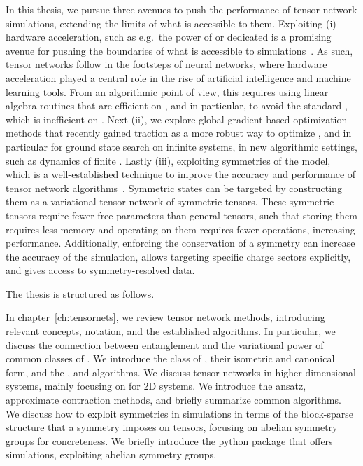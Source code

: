 In this thesis, we pursue three avenues to push the performance of tensor network simulations, extending the limits of what is accessible to them.
%
%
Exploiting (i) hardware acceleration, such as e.g.~the power of  or dedicated  is a promising avenue for pushing the boundaries of what is accessible to  simulations~\cite{ganahl2023, menczer2023a, menczer2024}.
%
As such, tensor networks follow in the footsteps of neural networks, where hardware acceleration played a central role in the rise of artificial intelligence and machine learning tools.
%
From an algorithmic point of view, this requires using linear algebra routines that are efficient on , and in particular, to avoid the standard , which is inefficient on .
%
%
Next (ii), we explore global gradient-based optimization methods that recently gained traction as a more robust way to optimize , and in particular for ground state search on infinite systems, in new algorithmic settings, such as dynamics of finite .
%
Lastly (iii), exploiting symmetries of the model, which is a well-established technique to improve the accuracy and performance of tensor network algorithms~\cite{singh2010b, weichselbaum2012}.
%
Symmetric states can be targeted by constructing them as a variational tensor network of symmetric tensors.
%
These symmetric tensors require fewer free parameters than general tensors, such that storing them requires less memory and operating on them requires fewer  operations, increasing performance.
%
Additionally, enforcing the conservation of a symmetry can increase the accuracy of the simulation, allows targeting specific charge sectors explicitly, and gives access to symmetry-resolved data.


The thesis is structured as follows.


In chapter~\ref{ch:tensornets}, we review tensor network methods, introducing relevant concepts, notation, and the established  algorithms.
%
In particular, we discuss the connection between entanglement and the variational power of common classes of .
%
We introduce the class of , their isometric and canonical form, and the ,  and  algorithms.
%
We discuss tensor networks in higher-dimensional systems, mainly focusing on  for 2D systems.
%
We introduce the ansatz, approximate contraction methods, and briefly summarize common algorithms.
%
We discuss how to exploit symmetries in  simulations in terms of the block-sparse structure that a symmetry imposes on tensors, focusing on abelian symmetry groups for concreteness.
%
We briefly introduce the  python package that offers  simulations, exploiting abelian symmetry groups.

